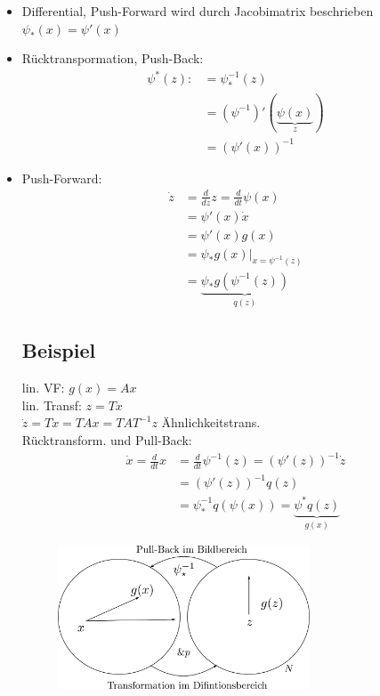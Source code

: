 \documentclass[ngerman]{tudscrreprt}
\begin{document}
\begin{itemize}
\item Differential, Push-Forward wird durch Jacobimatrix beschrieben $\psi_{*}(x) = \psi'(x) $
\item Rücktranspormation, Push-Back: 
\begin{align*}
\psi^{*} (z):&= \psi_{*}^{-1} (z)\\ 
&=(\psi^{-1})' (\underbrace{\psi(x)}_{z})\\ 
&=(\psi' (x))^{-1}   
\end{align*}
\item Push-Forward: 
\begin{align*}
\dot z &= \frac{d}{dz}  z  = \frac{d}{dt} \psi (x)\\ 
&= \psi'(x)\dot x\\ 
&= \psi'(x)g(x)\\ 
&= \psi_{*}g(x)|_{x=\psi^{-1}(z)}\\ 
&= \underbrace{\psi_{*}g(\psi^{-1} (z))}_{q(z)}
\end{align*}
\subsection*{Beispiel}lin. VF: $g(x) = Ax$\\ lin. Transf: $z= Tx$\\ 
$\dot z = T\dot x= TAx = TAT^{-1} z$ Ähnlichkeitstrans.\\ 
Rücktransform. und Pull-Back: 
\begin{align*}
\dot x = \frac{d}{dt}x &= \frac{d}{dt}\psi^{-1}(z) = (\psi'(z))^{-1}\dot z\\ 
&=(\psi'(z))^{-1}q(z)\\ 
&=\psi_{*}^{-1}q (\psi(x))=\underbrace{\psi^{*} q(z)}_{g(x)}
\end{align*}
\begin{figure}[H]
\centering
\def\svgwidth{200pt} 
  \includegraphics[width=7.5cm]{images/im3_121.pdf}
\end{figure}
\end{itemize}
\end{document}
